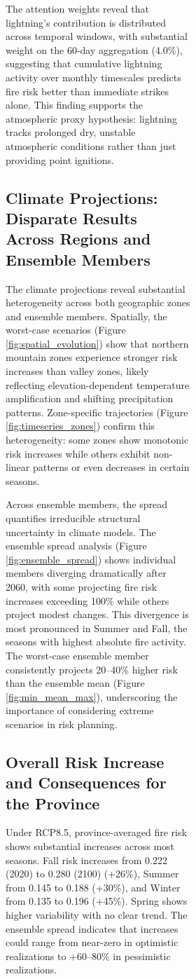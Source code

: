\documentclass[11pt,a4paper]{article}
\begin{document}
\begin{figure}[H]
\begin{figure}[H]
\begin{figure}[H]
The attention weights reveal that lightning's contribution is distributed across temporal windows, with substantial weight on the 60-day aggregation (4.0\%), suggesting that cumulative lightning activity over monthly timescales predicts fire risk better than immediate strikes alone. This finding supports the atmospheric proxy hypothesis: lightning tracks prolonged dry, unstable atmospheric conditions rather than just providing point ignitions.

\subsection{Climate Projections: Disparate Results Across Regions and Ensemble Members}

The climate projections reveal substantial heterogeneity across both geographic zones and ensemble members. Spatially, the worst-case scenarios (Figure \ref{fig:spatial_evolution}) show that northern mountain zones experience stronger risk increases than valley zones, likely reflecting elevation-dependent temperature amplification and shifting precipitation patterns. Zone-specific trajectories (Figure \ref{fig:timeseries_zones}) confirm this heterogeneity: some zones show monotonic risk increases while others exhibit non-linear patterns or even decreases in certain seasons.

Across ensemble members, the spread quantifies irreducible structural uncertainty in climate models. The ensemble spread analysis (Figure \ref{fig:ensemble_spread}) shows individual members diverging dramatically after 2060, with some projecting fire risk increases exceeding 100\% while others project modest changes. This divergence is most pronounced in Summer and Fall, the seasons with highest absolute fire activity. The worst-case ensemble member consistently projects 20--40\% higher risk than the ensemble mean (Figure \ref{fig:min_mean_max}), underscoring the importance of considering extreme scenarios in risk planning.

\subsection{Overall Risk Increase and Consequences for the Province}

Under RCP8.5, province-averaged fire risk shows substantial increases across most seasons. Fall risk increases from 0.222 (2020) to 0.280 (2100) (+26\%), Summer from 0.145 to 0.188 (+30\%), and Winter from 0.135 to 0.196 (+45\%). Spring shows higher variability with no clear trend. The ensemble spread indicates that increases could range from near-zero in optimistic realizations to +60--80\% in pessimistic realizations.


\end{figure}
\end{figure}
\end{figure}
\end{document}
